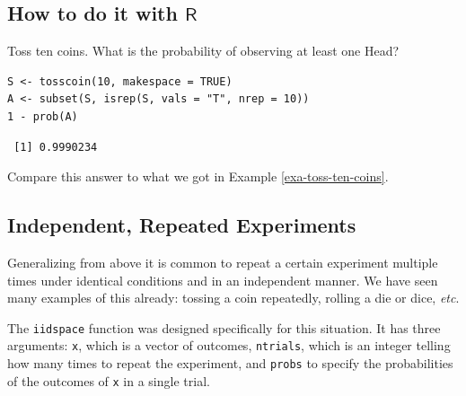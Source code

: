\documentclass[captions=tableheading]{scrbook}
\begin{document}
\subsection{How to do it with \(\mathsf{R}\)}
\label{sec-4-7-1}


\begin{example}
Toss ten coins. What is the probability of observing at least one Head?


\begin{verbatim}
S <- tosscoin(10, makespace = TRUE)
A <- subset(S, isrep(S, vals = "T", nrep = 10))
1 - prob(A)
\end{verbatim}

\begin{verbatim}
 [1] 0.9990234
\end{verbatim}

Compare this answer to what we got in Example \ref{exa-toss-ten-coins}.

\end{example}
\subsection{Independent, Repeated Experiments}
\label{sec-4-7-2}


Generalizing from above it is common to repeat a certain experiment multiple times under identical conditions and in an independent manner. We have seen many examples of this already: tossing a coin repeatedly, rolling a die or dice, \emph{etc}.

The \texttt{iidspace} function was designed specifically for this situation. It has three arguments: \texttt{x}, which is a vector of outcomes, \texttt{ntrials}, which is an integer telling how many times to repeat the experiment, and \texttt{probs} to specify the probabilities of the outcomes of \texttt{x} in a single trial. 
\end{document}
